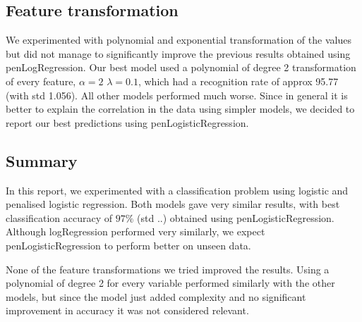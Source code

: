 \subsection{Feature transformation}
We experimented with polynomial and exponential transformation of the values but did not manage to significantly improve the previous results obtained using penLogRegression. Our best model used a polynomial of degree 2 transformation of every feature, $\alpha=2$ $\lambda=0.1$, which had a recognition rate of approx 95.77 (with std 1.056). All other models performed much worse.
Since in general it is better to explain the correlation in the data using simpler models, we decided to report our best predictions using penLogisticRegression.

\subsection{Summary}

In this report, we experimented with a classification problem using logistic and penalised logistic regression. Both models gave very similar results, with best classification accuracy of  $97\%$ (std ..) obtained using penLogisticRegression. Although logRegression performed very similarly, we expect penLogisticRegression to perform better on unseen data.

None of the feature transformations we tried improved the results. Using a polynomial of degree 2 for every variable performed similarly with the other models, but since the model just added complexity and no significant improvement in accuracy it was not considered relevant.